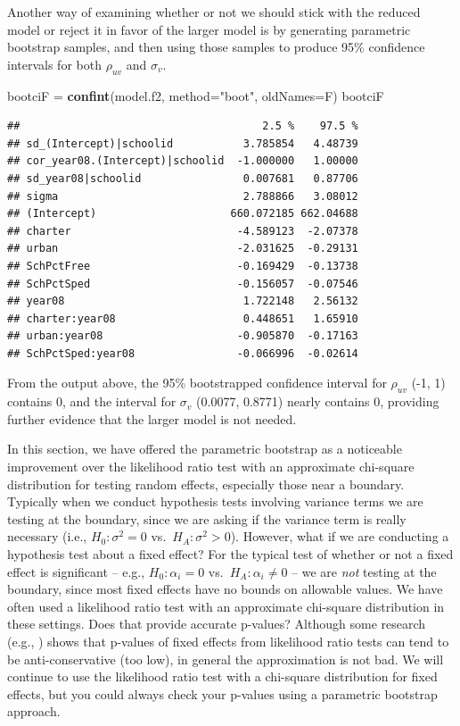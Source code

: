 \documentclass[
]{krantz}
\newenvironment{Shaded}{\begin{snugshade}}{\end{snugshade}}
\newcommand{\AttributeTok}[1]{\textcolor[rgb]{0.27,0.27,0.27}{#1}}
\newcommand{\FunctionTok}[1]{\textcolor[rgb]{0.27,0.27,0.27}{\textbf{#1}}}
\newcommand{\NormalTok}[1]{#1}
\newcommand{\OtherTok}[1]{\textcolor[rgb]{0.37,0.37,0.37}{#1}}
\newcommand{\StringTok}[1]{\textcolor[rgb]{0.5,0.5,0.5}{#1}}
\begin{document}
Another way of examining whether or not we should stick with the reduced model or reject it in favor of the larger model is by generating parametric bootstrap samples, and then using those samples to produce 95\% confidence intervals for both \(\rho_{uv}\) and \(\sigma_{v}\).

\begin{Shaded}
\begin{Highlighting}[]
\NormalTok{bootciF }\OtherTok{=} \FunctionTok{confint}\NormalTok{(model.f2, }\AttributeTok{method=}\StringTok{"boot"}\NormalTok{, }\AttributeTok{oldNames=}\NormalTok{F)}
\NormalTok{bootciF}
\end{Highlighting}
\end{Shaded}

\begin{verbatim}
##                                      2.5 %    97.5 %
## sd_(Intercept)|schoolid           3.785854   4.48739
## cor_year08.(Intercept)|schoolid  -1.000000   1.00000
## sd_year08|schoolid                0.007681   0.87706
## sigma                             2.788866   3.08012
## (Intercept)                     660.072185 662.04688
## charter                          -4.589123  -2.07378
## urban                            -2.031625  -0.29131
## SchPctFree                       -0.169429  -0.13738
## SchPctSped                       -0.156057  -0.07546
## year08                            1.722148   2.56132
## charter:year08                    0.448651   1.65910
## urban:year08                     -0.905870  -0.17163
## SchPctSped:year08                -0.066996  -0.02614
\end{verbatim}

From the output above, the 95\% bootstrapped confidence interval for \(\rho_{uv}\) (-1, 1) contains 0, and the interval for \(\sigma_{v}\) (0.0077, 0.8771) nearly contains 0, providing further evidence that the larger model is not needed.

In this section, we have offered the parametric bootstrap as a noticeable improvement over the likelihood ratio test with an approximate chi-square distribution for testing random effects, especially those near a boundary. Typically when we conduct hypothesis tests involving variance terms we are testing at the boundary, since we are asking if the variance term is really necessary (i.e., \(H_0: \sigma^2=0\) vs.~\(H_A: \sigma^2 > 0\)). However, what if we are conducting a hypothesis test about a fixed effect? For the typical test of whether or not a fixed effect is significant -- e.g., \(H_0: \alpha_i=0\) vs.~\(H_A: \alpha_i \neq 0\) -- we are \emph{not} testing at the boundary, since most fixed effects have no bounds on allowable values. We have often used a likelihood ratio test with an approximate chi-square distribution in these settings. Does that provide accurate p-values? Although some research (e.g., \citet{Faraway2005}) shows that p-values of fixed effects from likelihood ratio tests can tend to be anti-conservative (too low), in general the approximation is not bad. We will continue to use the likelihood ratio test with a chi-square distribution for fixed effects, but you could always check your p-values using a parametric bootstrap approach.
\end{document}
